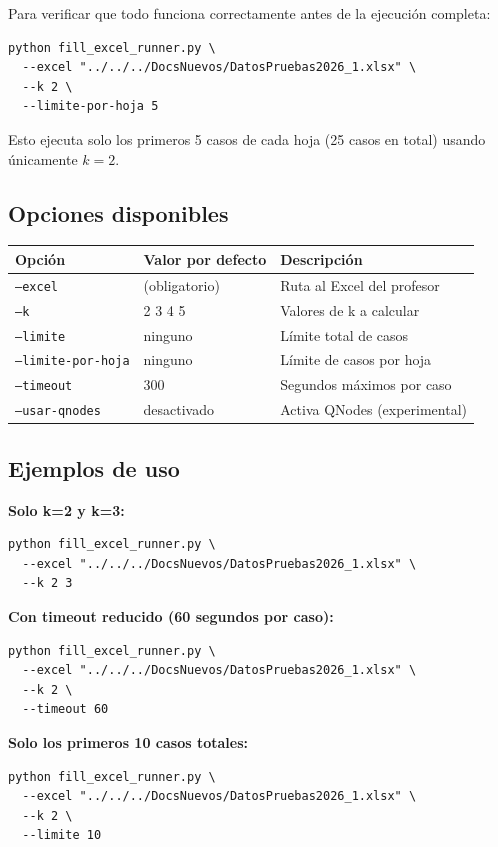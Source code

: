 \documentclass[12pt,a4paper]{article}
\begin{document}
Para verificar que todo funciona correctamente antes de la ejecución completa:

\begin{lstlisting}
python fill_excel_runner.py \
  --excel "../../../DocsNuevos/DatosPruebas2026_1.xlsx" \
  --k 2 \
  --limite-por-hoja 5
\end{lstlisting}

Esto ejecuta solo los primeros 5 casos de cada hoja (25 casos en total) usando únicamente $k=2$.

\subsection{Opciones disponibles}

\begin{longtable}{lll}
    \toprule
    Opción & Valor por defecto & Descripción \\
    \midrule
    \endhead
    \texttt{--excel} & (obligatorio) & Ruta al Excel del profesor \\
    \texttt{--k} & 2 3 4 5 & Valores de k a calcular \\
    \texttt{--limite} & ninguno & Límite total de casos \\
    \texttt{--limite-por-hoja} & ninguno & Límite de casos por hoja \\
    \texttt{--timeout} & 300 & Segundos máximos por caso \\
    \texttt{--usar-qnodes} & desactivado & Activa QNodes (experimental) \\
    \bottomrule
\end{longtable}

\subsection{Ejemplos de uso}

\textbf{Solo k=2 y k=3:}
\begin{lstlisting}
python fill_excel_runner.py \
  --excel "../../../DocsNuevos/DatosPruebas2026_1.xlsx" \
  --k 2 3
\end{lstlisting}

\textbf{Con timeout reducido (60 segundos por caso):}
\begin{lstlisting}
python fill_excel_runner.py \
  --excel "../../../DocsNuevos/DatosPruebas2026_1.xlsx" \
  --k 2 \
  --timeout 60
\end{lstlisting}

\textbf{Solo los primeros 10 casos totales:}
\begin{lstlisting}
python fill_excel_runner.py \
  --excel "../../../DocsNuevos/DatosPruebas2026_1.xlsx" \
  --k 2 \
  --limite 10
\end{lstlisting}
\end{document}
